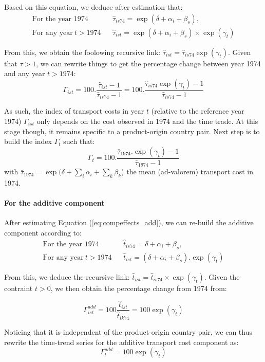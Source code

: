 \documentclass[a4paper,11pt]{article}
\begin{document}
Based on this equation, we deduce after estimation that: 
\begin{eqnarray*}
\text{For the year 1974}&& \widehat{\tau}_{is74} = \exp(\delta +\alpha_i+\beta_s), \\
\text{For any year}~t> 1974&& \widehat{\tau}_{ist} = \exp(\delta +\alpha_i+\beta_s)\times \exp(\gamma_t)
\end{eqnarray*} 

From this, we obtain the foolowing recursive link: $\widehat{\tau}_{ist} = \widehat{\tau}_{is74}\exp(\gamma_t)$. Given that $\tau >1$, we can rewrite things to get the percentage change between year 1974 and any year $t>1974$:
$$\Gamma_{ist} = 100.\frac{\widehat{\tau}_{ist}-1}{\widehat{\tau}_{is74}-1} = 100.\frac{\widehat{\tau}_{is74}\exp(\gamma_t)-1}{\widehat{\tau}_{is74}-1}$$

As such, the index of transport costs in year $t$ (relative to the reference year 1974) $\Gamma_{ist} $  only depends on the cost observed in 1974 and the time trade. At this stage though, it remains specific to a product-origin country pair. Next step is to build the index $\Gamma_t$ such that:
\begin{equation*}
 \Gamma_t= 100.\frac {\bar{\tau}_{1974}.\exp(\gamma_t)-1} {\bar{\tau}_{1974}-1}
\end{equation*}
\noindent with $\bar{\tau}_{1974} = \exp(\delta + \sum_i \alpha_i + \sum_k \beta_k$) the mean (ad-valorem) transport cost in 1974. 

\paragraph{For the additive component} After estimating Equation (\ref{eq:compeffects_add}), we can re-build the additive component according to:
\begin{eqnarray*}
\text{For the year 1974}&&\widehat{t}_{is74}=  \delta + \alpha_i+ \beta_s, \\
\text{For any year}~t> 1974&&\widehat{t}_{ist}=\left(\delta + \alpha_i+ \beta_s\right).\exp(\gamma_t)
\end{eqnarray*}

From this, we deduce the recursive link: $\widehat{t}_{ist} = \widehat{t}_{is74} \times \exp(\gamma_t)$. Given the contraint $t>0$, we then obtain the percentage change from 1974 from:

\begin{equation*}
\Gamma^{add}_{ist} = 100\frac{\widehat{t}_{ist}}{\widehat{t}_{ik74}} = 100\exp(\gamma_t)
\end{equation*}

Noticing that it is independent of the product-origin country pair, we can thus rewrite the time-trend series for the additive transport cost component as:
$$\Gamma^{add}_t  = 100\exp(\gamma_t) $$
\end{document}
